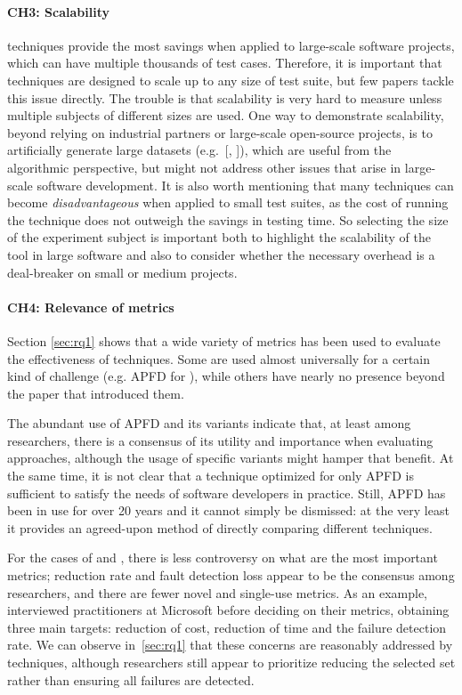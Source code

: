 \paragraph{CH3: Scalability}
\rt techniques provide the most savings when applied to large-scale software projects, which can have multiple thousands of test cases.
Therefore, it is important that techniques are designed to scale up to any size of test suite, but few papers tackle this issue directly.
The trouble is that scalability is very hard to measure unless multiple subjects of different sizes are used.
One way to demonstrate scalability, beyond relying on industrial partners or large-scale open-source projects, is to artificially generate large datasets (e.g.~[, ]), which are useful from the algorithmic perspective, but might not address other issues that arise in large-scale software development.
It is also worth mentioning that many \rt techniques can become \textit{disadvantageous} when applied to small test suites, as the cost of running the technique does not outweigh the savings in testing time.
So selecting the size of the experiment subject is important both to highlight the scalability of the tool in large software and also to consider whether the necessary overhead is a deal-breaker on small or medium projects.


\paragraph{CH4: Relevance of metrics}
Section \ref{sec:rq1} shows that a wide variety of metrics has been used to evaluate the effectiveness of \rt techniques.
Some are used almost universally for a certain kind of challenge (e.g. APFD for \tcp), while others have nearly no presence beyond the paper that introduced them.

The abundant use of APFD and its variants indicate that, at least among researchers, there is a consensus of its utility and importance when evaluating \tcp approaches, although the usage of specific variants might hamper that benefit.
At the same time, it is not clear that a technique optimized for only APFD is sufficient to satisfy the needs of software developers in practice.
Still, APFD has been in use for over 20 years and it cannot simply be dismissed: at the very least it provides an agreed-upon method of directly comparing different techniques.

For the cases of \tcs and \tsr, there is less controversy on what are the most important metrics; reduction rate and fault detection loss appear to be the consensus among researchers, and there are fewer novel and single-use metrics.
As an example,~ interviewed practitioners at Microsoft before deciding on their \tcs metrics, obtaining three main targets: reduction of cost, reduction of time and the failure detection rate.
We can observe in~\autoref{sec:rq1} that these concerns are reasonably addressed by \tcs techniques, although researchers still appear to prioritize reducing the selected set rather than ensuring all failures are detected.

